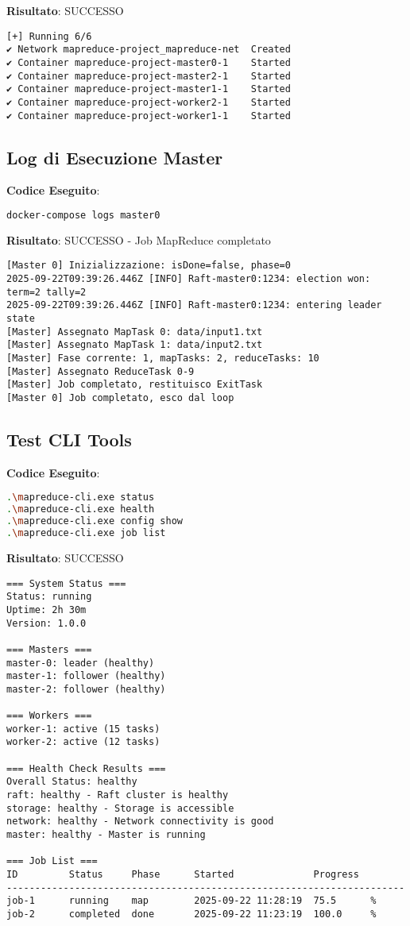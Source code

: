 \documentclass[12pt,a4paper]{article}
\begin{document}
\textbf{Risultato}: SUCCESSO
\begin{lstlisting}
[+] Running 6/6
✔ Network mapreduce-project_mapreduce-net  Created
✔ Container mapreduce-project-master0-1    Started
✔ Container mapreduce-project-master2-1    Started
✔ Container mapreduce-project-master1-1    Started
✔ Container mapreduce-project-worker2-1    Started
✔ Container mapreduce-project-worker1-1    Started
\end{lstlisting}

\subsection{Log di Esecuzione Master}

\textbf{Codice Eseguito}:
\begin{lstlisting}[language=bash]
docker-compose logs master0
\end{lstlisting}

\textbf{Risultato}: SUCCESSO - Job MapReduce completato
\begin{lstlisting}
[Master 0] Inizializzazione: isDone=false, phase=0
2025-09-22T09:39:26.446Z [INFO] Raft-master0:1234: election won: term=2 tally=2
2025-09-22T09:39:26.446Z [INFO] Raft-master0:1234: entering leader state
[Master] Assegnato MapTask 0: data/input1.txt
[Master] Assegnato MapTask 1: data/input2.txt
[Master] Fase corrente: 1, mapTasks: 2, reduceTasks: 10
[Master] Assegnato ReduceTask 0-9
[Master] Job completato, restituisco ExitTask
[Master 0] Job completato, esco dal loop
\end{lstlisting}

\subsection{Test CLI Tools}

\textbf{Codice Eseguito}:
\begin{lstlisting}[language=bash]
.\mapreduce-cli.exe status
.\mapreduce-cli.exe health
.\mapreduce-cli.exe config show
.\mapreduce-cli.exe job list
\end{lstlisting}

\textbf{Risultato}: SUCCESSO
\begin{lstlisting}
=== System Status ===
Status: running
Uptime: 2h 30m
Version: 1.0.0

=== Masters ===
master-0: leader (healthy)
master-1: follower (healthy)
master-2: follower (healthy)

=== Workers ===
worker-1: active (15 tasks)
worker-2: active (12 tasks)

=== Health Check Results ===
Overall Status: healthy
raft: healthy - Raft cluster is healthy
storage: healthy - Storage is accessible
network: healthy - Network connectivity is good
master: healthy - Master is running

=== Job List ===
ID         Status     Phase      Started              Progress  
----------------------------------------------------------------------
job-1      running    map        2025-09-22 11:28:19  75.5      %
job-2      completed  done       2025-09-22 11:23:19  100.0     %
\end{lstlisting}
\end{document}
